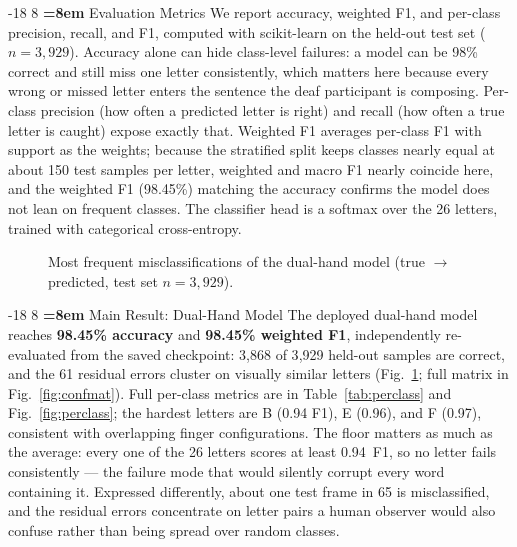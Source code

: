 \documentclass{llncs}
\makeatletter
\renewcommand\subsection{\@startsection{subsection}{2}{\z@}%
                      {-18\p@ \@plus -4\p@ \@minus -4\p@}%
                      {8\p@ \@plus 4\p@ \@minus 4\p@}%
                      {\normalfont\large\bfseries\boldmath
                       \rightskip=\z@ \@plus 8em\pretolerance=10000 }}
\makeatother
\begin{document}
\subsection{Evaluation Metrics}
\label{sec:metrics}
We report accuracy, weighted F1, and per-class precision, recall, and
F1, computed with scikit-learn on the held-out test set ($n{=}3{,}929$).
Accuracy alone can hide class-level failures: a model can be 98\% correct
and still miss one letter consistently, which matters here because every
wrong or missed letter enters the sentence the deaf participant is
composing. Per-class precision (how often a predicted letter is right)
and recall (how often a true letter is caught) expose exactly that.
Weighted F1 averages per-class F1 with support as the weights; because
the stratified split keeps classes nearly equal at about 150 test
samples per letter, weighted and macro F1 nearly coincide here, and the
weighted F1 (98.45\%) matching the accuracy confirms the model does not
lean on frequent classes. The classifier head is a softmax over the 26
letters, trained with categorical cross-entropy.

\begin{figure}[t]
\centering
{}
\caption{Most frequent misclassifications of the dual-hand model
(true $\rightarrow$ predicted, test set $n{=}3{,}929$).}
\label{fig:confusions}
\end{figure}

\subsection{Main Result: Dual-Hand Model}
The deployed dual-hand model reaches \textbf{98.45\% accuracy} and
\textbf{98.45\% weighted F1}, independently re-evaluated from the saved
checkpoint: 3{,}868 of 3{,}929 held-out samples are correct, and the 61
residual errors cluster on visually similar letters
(Fig.~\ref{fig:confusions}; full matrix in Fig.~\ref{fig:confmat}).
Full per-class metrics are in
Table~\ref{tab:perclass} and Fig.~\ref{fig:perclass}; the hardest
letters are B (0.94 F1), E (0.96), and F (0.97), consistent with
overlapping finger configurations. The floor matters as much as the
average: every one of the 26 letters scores at least 0.94~F1, so no
letter fails consistently --- the failure mode that would silently
corrupt every word containing it. Expressed differently, about one
test frame in 65 is misclassified, and the residual errors concentrate
on letter pairs a human observer would also confuse rather than being
spread over random classes.
\end{document}
